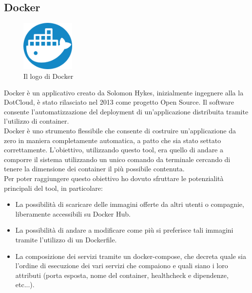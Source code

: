 \subsection{Docker}
\begin{figure}[h]
    \centering
    \includegraphics[width=100px]{./images/docker_logo.png}
    \caption{Il logo di Docker}
    \label{fig:Docker}
\end{figure}
Docker è un applicativo creato da Solomon Hykes, inizialmente ingegnere alla la DotCloud, è stato rilasciato nel 2013 come progetto Open Source.\cite{DockerHistory} Il software consente l'automatizzazione del deployment di un'applicazione distribuita tramite l'utilizzo di container.
\\
Docker è uno strumento flessibile che consente di costruire un'applicazione da zero in maniera completamente automatica, a patto che sia stato settato correttamente. L'obiettivo, utilizzando questo tool, era quello di andare a comporre il sistema utilizzando un unico comando da terminale cercando di tenere la dimensione dei container il più possibile contenuta.
\\
Per poter raggiungere questo obiettivo ho dovuto sfruttare le potenzialità principali del tool, in particolare:
\begin{itemize}
    \item La possibilità di scaricare delle immagini offerte da altri utenti o compagnie, liberamente accessibili su Docker Hub.
    \item La possibilità di andare a modificare come più si preferisce tali immagini tramite l'utilizzo di un Dockerfile.
    \item La composizione dei servizi tramite un docker-compose, che decreta quale sia l'ordine di esecuzione dei vari servizi che compaiono e quali siano i loro attributi (porta esposta, nome del container, healthcheck e dipendenze, etc...).
\end{itemize}


